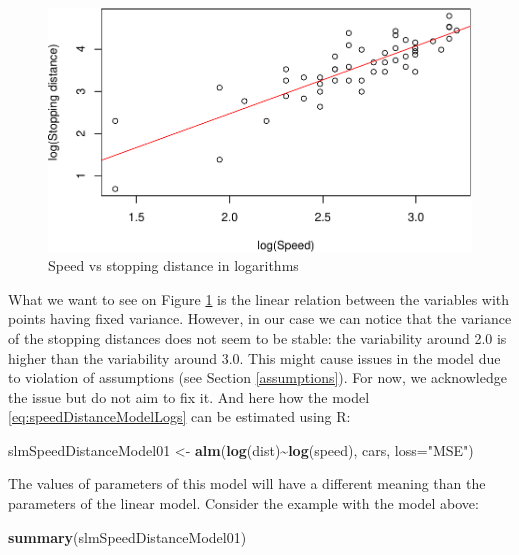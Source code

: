 \documentclass[
]{book}
\newenvironment{Shaded}{\begin{snugshade}}{\end{snugshade}}
\newcommand{\AttributeTok}[1]{\textcolor[rgb]{0.13,0.29,0.53}{#1}}
\newcommand{\FunctionTok}[1]{\textcolor[rgb]{0.13,0.29,0.53}{\textbf{#1}}}
\newcommand{\NormalTok}[1]{#1}
\newcommand{\OtherTok}[1]{\textcolor[rgb]{0.56,0.35,0.01}{#1}}
\newcommand{\SpecialCharTok}[1]{\textcolor[rgb]{0.81,0.36,0.00}{\textbf{#1}}}
\newcommand{\StringTok}[1]{\textcolor[rgb]{0.31,0.60,0.02}{#1}}
\theoremstyle{definition}
\theoremstyle{definition}
\theoremstyle{definition}
\theoremstyle{definition}
\theoremstyle{remark}
\begin{document}
\begin{figure}
\centering
\includegraphics{Svetunkov---Statistics-for-Business-Analytics_files/figure-latex/speedDistanceLogs-1.pdf}
\caption{\label{fig:speedDistanceLogs}Speed vs stopping distance in logarithms}
\end{figure}

What we want to see on Figure \ref{fig:speedDistanceLogs} is the linear relation between the variables with points having fixed variance. However, in our case we can notice that the variance of the stopping distances does not seem to be stable: the variability around 2.0 is higher than the variability around 3.0. This might cause issues in the model due to violation of assumptions (see Section \ref{assumptions}). For now, we acknowledge the issue but do not aim to fix it. And here how the model \eqref{eq:speedDistanceModelLogs} can be estimated using R:

\begin{Shaded}
\begin{Highlighting}[]
\NormalTok{slmSpeedDistanceModel01 }\OtherTok{\textless{}{-}} \FunctionTok{alm}\NormalTok{(}\FunctionTok{log}\NormalTok{(dist)}\SpecialCharTok{\textasciitilde{}}\FunctionTok{log}\NormalTok{(speed), cars, }\AttributeTok{loss=}\StringTok{"MSE"}\NormalTok{)}
\end{Highlighting}
\end{Shaded}

The values of parameters of this model will have a different meaning than the parameters of the linear model. Consider the example with the model above:

\begin{Shaded}
\begin{Highlighting}[]
\FunctionTok{summary}\NormalTok{(slmSpeedDistanceModel01)}
\end{Highlighting}
\end{Shaded}
\end{document}

